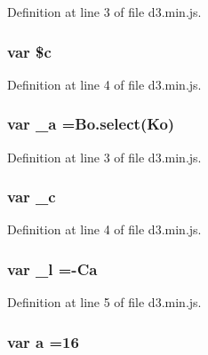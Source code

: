 Definition at line 3 of file d3.\+min.\+js.

\subsubsection[{\$c}]{\setlength{\rightskip}{0pt plus 5cm}var \${\bf c}}\label{d3_8min_8js_a032d036ce86a8cc586892cfaba2b80dc}


Definition at line 4 of file d3.\+min.\+js.

\subsubsection[{\+\_\+a}]{\setlength{\rightskip}{0pt plus 5cm}var \+\_\+a ={\bf Bo.\+select}({\bf Ko})}\label{d3_8min_8js_a0adf123df8967a14b5bdd9ff3bbe2d0c}


Definition at line 3 of file d3.\+min.\+js.

\subsubsection[{\+\_\+c}]{\setlength{\rightskip}{0pt plus 5cm}var \+\_\+c}\label{d3_8min_8js_aa9188bfce96541e3026ad83bee2ab87c}


Definition at line 4 of file d3.\+min.\+js.

\subsubsection[{\+\_\+l}]{\setlength{\rightskip}{0pt plus 5cm}var \+\_\+l =-\/{\bf Ca}}\label{d3_8min_8js_a3f6dae89596f72e6350a403a6192b5cb}


Definition at line 5 of file d3.\+min.\+js.

\subsubsection[{a}]{\setlength{\rightskip}{0pt plus 5cm}var {\bf a} =16}\label{d3_8min_8js_a82ca4ee5dd63e58a2bb967077dc8b8fb}


